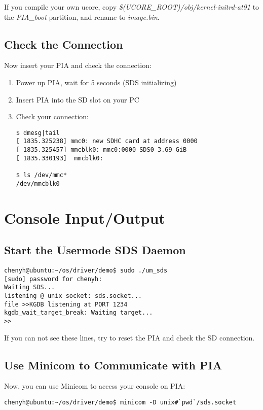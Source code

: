 \documentclass[a4paper]{article}
\begin{document}
If you compile your own ucore, copy \emph{\$(UCORE\_ROOT)/obj/kernel-initrd-at91}
to the \emph{PIA\_boot} partition, and rename to \emph{image.bin}.

\subsection{Check the Connection}
\label{sec:checkconn}
Now insert your PIA and check the connection:
\begin{enumerate}
  \item Power up PIA, wait for 5 seconds (SDS initializing)
  \item Insert PIA into the SD slot on your PC
  \item Check your connection:
    \begin{verbatim}
$ dmesg|tail
[ 1835.325238] mmc0: new SDHC card at address 0000
[ 1835.325457] mmcblk0: mmc0:0000 SDS0 3.69 GiB 
[ 1835.330193]  mmcblk0:

$ ls /dev/mmc*
/dev/mmcblk0
    \end{verbatim}

\end{enumerate}

\section{Console Input/Output}

\subsection{Start the Usermode SDS Daemon}

\begin{verbatim}
chenyh@ubuntu:~/os/driver/demo$ sudo ./um_sds 
[sudo] password for chenyh: 
Waiting SDS...
listening @ unix socket: sds.socket...
file >>KGDB listening at PORT 1234
kgdb_wait_target_break: Waiting target...
>>
\end{verbatim}

If you can not see these lines, try to reset the PIA and 
check the SD connection. 

\subsection{Use Minicom to Communicate with PIA}
Now, you can use Minicom to access your console on PIA:
\begin{verbatim}
chenyh@ubuntu:~/os/driver/demo$ minicom -D unix#`pwd`/sds.socket
\end{verbatim}
\end{document}
